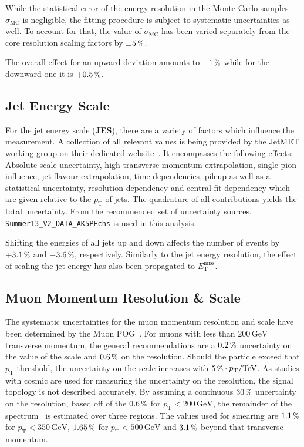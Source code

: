 While the statistical error of the energy resolution in the Monte Carlo samples $\sigma_{\text{MC}}$ is negligible, the fitting procedure is subject to systematic uncertainties as well. To account for that, the value of $\sigma_{\text{MC}}$ has been varied separately from the core resolution scaling factors by $\pm 5\,\pct$.

The overall effect for an upward deviation amounts to $-1\,\pct$ while for the downward one it is $+0.5\,\pct$.


\subsection{Jet Energy Scale}
\label{sec:jes}

For the jet energy scale (\textbf{JES}), there are a variety of factors which influence the measurement. A collection of all relevant values is being provided by the JetMET working group on their dedicated website~\cite{jes}. It encompasses the following effects: Absolute scale uncertainty, high transverse momentum extrapolation, single pion influence, jet flavour extrapolation, time dependencies, pileup as well as a statistical uncertainty, resolution dependency and central fit dependency which are given relative to the $p_{\text{T}}$ of jets. The quadrature of all contributions yields the total uncertainty. From the recommended set of uncertainty sources, \verb+Summer13_V2_DATA_AK5PFchs+ is used in this analysis. 

Shifting the energies of all jets up and down affects the number of events by $+3.1\,\pct$ and $-3.6\,\pct$, respectively. Similarly to the jet energy resolution, the effect of scaling the jet energy has also been propagated to $E_{\text{T}}^{\text{miss}}$.


\subsection{Muon Momentum Resolution \& Scale}
\label{sec:mers}

The systematic uncertainties for the muon momentum resolution and scale have been determined by the Muon POG~\cite{muonid2}. For muons with less than $200\,\text{GeV}$ transverse momentum, the general recommendations are a $0.2\,\pct$ uncertainty on the value of the scale and $0.6\,\pct$ on the resolution. Should the particle exceed that $p_{\text{T}}$ threshold, the uncertainty on the scale increases with $5\,\pct \cdot p_{\text{T}}/\text{TeV}$. As studies with cosmic are used for measuring the uncertainty on the resolution, the signal topology is not described accurately. By assuming a continuous $30\,\pct$ uncertainty on the resolution, based off of the $0.6\,\pct$ for $p_{\text{T}} < 200\,\text{GeV}$, the remainder of the spectrum~\cite{muonptscale} is estimated over three regions. The values used for smearing are $1.1\,\pct$ for $p_{\text{T}} < 350\,\text{GeV}$, $1.65\,\pct$ for $p_{\text{T}} < 500\,\text{GeV}$ and $3.1\,\pct$ beyond that transverse momentum.

